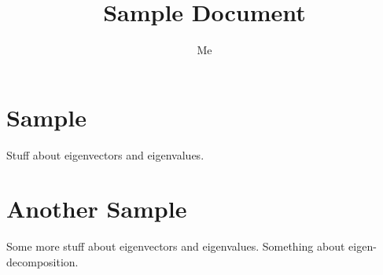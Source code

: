\documentclass[12pt,oneside]{scrbook}
\title{Sample Document}
\author{Me}
\begin{document}
\maketitle

\chapter{Sample}
Stuff about eigenvectors and
eigenvalues.

\chapter{Another Sample}
Some more stuff about eigenvectors and
eigenvalues. Something about
eigen-decomposition.

\backmatter
\printindex
\end{document}
